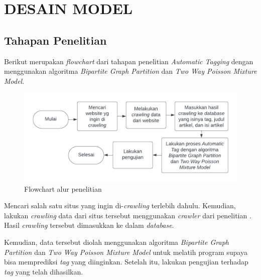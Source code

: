 
\chapter{DESAIN MODEL}

\section{Tahapan Penelitian}

Berikut merupakan \emph{flowchart} dari tahapan penelitian \emph{Automatic Tagging} dengan menggunakan algoritma \emph{Bipartite Graph Partition} dan \emph{Two Way Poisson Mixture Model}.

\begin{figure}[H]
    \centering
    \includegraphics[width=1\textwidth]{gambar/Tahapan penelitian.png}
    \caption{Flowchart alur penelitian}
    \label{gambar:tahapan_penelitian}
\end{figure}

Mencari salah satu situs yang ingin di-\emph{crawling} terlebih dahulu. Kemudian, lakukan \emph{crawling} data dari situs tersebut menggunakan \emph{crawler} dari penelitian \cite{khatulistiwa_2022_searchengine}. Hasil \emph{crawling} tersebut dimasukkan ke dalam \emph{database}.

Kemudian, data tersebut diolah menggunakan algoritma \emph{Bipartite Graph Partition} dan \emph{Two Way Poisson Mixture Model} untuk melatih program supaya bisa memprediksi \emph{tag} yang diinginkan. Setelah itu, lakukan pengujian terhadap \emph{tag} yang telah dihasilkan.


